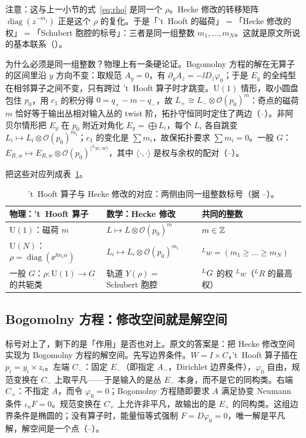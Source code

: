 注意：这与上一小节的式~\eqref{eq:rho} 是同一个 $\rho$。Hecke 修改的转移矩阵 $\operatorname{diag}(z^{-m_j})$ 正是这个 $\rho$ 的复化。于是「't~Hooft 的磁荷」$=$「Hecke 修改的权」$=$「Schubert 胞腔的标号」：三者是同一组整数 $m_1,\dots,m_N$。这就是原文所说的基本联系（）。

为什么必须是同一组整数？物理上有一条硬论证。Bogomolny 方程的解在无算子的区间里沿 $y$ 方向不变：取规范 $A_y=0$，有 $\partial_yA_{\bar z}=-\ii D_{\bar z}\varphi_0$；于是 $E_y$ 的全纯型在相邻算子之间不变，只有跨过 't~Hooft 算子时才跳变。$\mathrm{U}(1)$ 情形，取小圆盘包住 $p_0$，用 $c_1$ 的积分得 $0=q_+-m-q_-$，故 $L_+\cong L_-\otimes\mathcal O(p_0)^m$：奇点的磁荷 $m$ 恰好等于输出丛相对输入丛的 twist 阶，拓扑守恒同时定住了两边（--）。非阿贝尔情形把 $E_y$ 在 $p_0$ 附近对角化 $E_y=\bigoplus L_i$，每个 $L_i$ 各自跳变 $L_i\mapsto L_i\otimes\mathcal O(p_0)^{m_i}$；$c_1$ 的变化是 $\sum m_i$，故保拓扑要求 $\sum m_i=0$。一般 $G$：$E_{R,w}\mapsto E_{R,w}\otimes\mathcal O(p_0)^{\langle{}^{L}w,w\rangle}$，其中 $\langle\cdot,\cdot\rangle$ 是权与余权的配对（--）。

把这些对应列成表~\ref{tab:correspondence}。

\begin{table}[htbp]
\centering
\small
\caption{'t~Hooft 算子与 Hecke 修改的对应：两侧由同一组整数标号（据 --）。}
\label{tab:correspondence}
\begin{tabular}{@{}lll@{}}
\toprule
物理：'t~Hooft 算子 & 数学：Hecke 修改 & 共同的整数 \\
\midrule
$\mathrm{U}(1)$：磁荷 $m$ & $L\mapsto L\otimes\mathcal O(p_0)^m$ & $m\in\mathbb{Z}$ \\
$\mathrm{U}(N)$：$\rho=\operatorname{diag}(\ee^{\ii m_i\alpha})$ & $L_i\mapsto L_i\otimes\mathcal O(p_0)^{m_i}$ & ${}^{L}w=(m_1\ge\dots\ge m_N)$ \\
一般 $G$：$\rho:\mathrm{U}(1)\to G$ 的共轭类 & 轨道 $Y(\rho)=$ Schubert 胞腔 & ${}^{L}G$ 的权 ${}^{L}w$（${}^{L}R$ 的最高权） \\
\bottomrule
\end{tabular}
\end{table}

\subsection{Bogomolny 方程：修改空间就是解空间}

标号对上了，剩下的是「作用」是否也对上。原文的答案是：把 Hecke 修改空间实现为 Bogomolny 方程的解空间。先写边界条件。$W=I\times C$，'t~Hooft 算子插在 $p_i=y_i\times z_i$。左端 $C_-$：固定 $E_-$（即指定 $A_-$，Dirichlet 边界条件），$\varphi_0$ 自由，规范变换在 $C_-$ 上取平凡——于是输入的是丛 $E_-$ 本身，而不是它的同构类。右端 $C_+$：不指定 $A$，而令 $\varphi_0=0$；Bogomolny 方程随即要求 $A$ 满足协变 Neumann 条件 $\iota_nF=0$。规范变换在 $C_+$ 上允许非平凡，故输出的是 $E_+$ 的同构类。这组边界条件是椭圆的；没有算子时，能量恒等式强制 $F=D\varphi_0=0$，唯一解是平凡解，解空间是一个点（--）。

